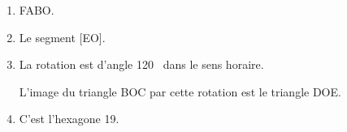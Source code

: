 \begin{enumerate}
	\item  %
	
FABO.
		
		\item %
		Le segment [EO].
		\item  %
		
La rotation est d'angle 120~\degres{} dans le sens horaire.

L'image du triangle BOC par cette rotation est le triangle DOE.
\item C'est l'hexagone 19.
	\end{enumerate}
	
\bigskip

